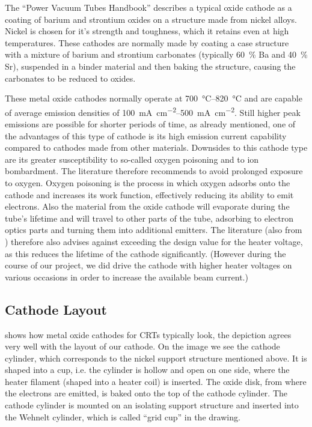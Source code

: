 The ``Power Vacuum Tubes Handbook'' \cite[chp 3.5.2.1]{Whitaker} describes a typical oxide cathode as a coating of barium and strontium oxides on a structure made from nickel alloys. Nickel is chosen for it's strength and toughness, which it retains even at high temperatures. These cathodes are normally made by coating a case structure with a mixture of barium and strontium carbonates (typically \SI{60}{\percent} Ba and \SI{40}{\percent} Sr), suspended in a binder material and then baking the structure, causing the carbonates to be reduced to oxides.

These metal oxide cathodes normally operate at \SIrange{700}{820}{\celsius} and are capable of average emission densities of \SIrange{100}{500}{\milli\ampere\per\centi\meter\squared}. Still higher peak emissions are possible for shorter periods of time, as already mentioned, one of the advantages of this type of cathode is its high emission current capability compared to cathodes made from other materials. Downsides to this cathode type are its greater susceptibility to so-called oxygen poisoning and to ion bombardment. The literature therefore recommends to avoid prolonged exposure to oxygen. Oxygen poisoning is the process in which oxygen adsorbs onto the cathode and increases its work function, effectively reducing its ability to emit electrons. 
Also the material from the oxide cathode will evaporate during the tube's lifetime and will travel to other parts of the tube, adsorbing to electron optics parts and turning them into additional emitters. The literature (also from \cite[chp 3.5.2.1]{Whitaker}) therefore also advises against exceeding the design value for the heater voltage, as this reduces the lifetime of the cathode significantly. (However during the course of our project, we did drive the cathode with higher heater voltages on various occasions in order to increase the available beam current.)

\subsection{Cathode Layout}

 shows how metal oxide cathodes for CRTs typically look, the depiction agrees very well with the layout of our cathode. On the image we see the cathode cylinder, which corresponds to the nickel support structure mentioned above. It is shaped into a cup, i.e. the cylinder is hollow and open on one side, where the heater filament (shaped into a heater coil) is inserted. The oxide disk, from where the electrons are emitted, is baked onto the top of the cathode cylinder. The cathode cylinder is mounted on an isolating support structure and inserted into the Wehnelt cylinder, which is called ``grid cup'' in the drawing. 
  

